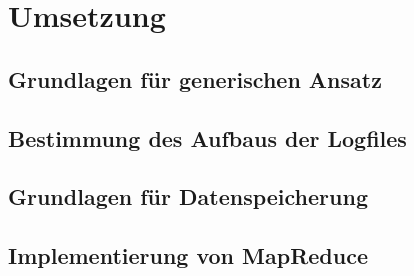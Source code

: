 
\chapter{Umsetzung}\label{cha:Umsetzung}

\section{Grundlagen für generischen Ansatz}

\section{Bestimmung des Aufbaus der Logfiles}

\section{Grundlagen für Datenspeicherung}

\section{Implementierung von MapReduce}